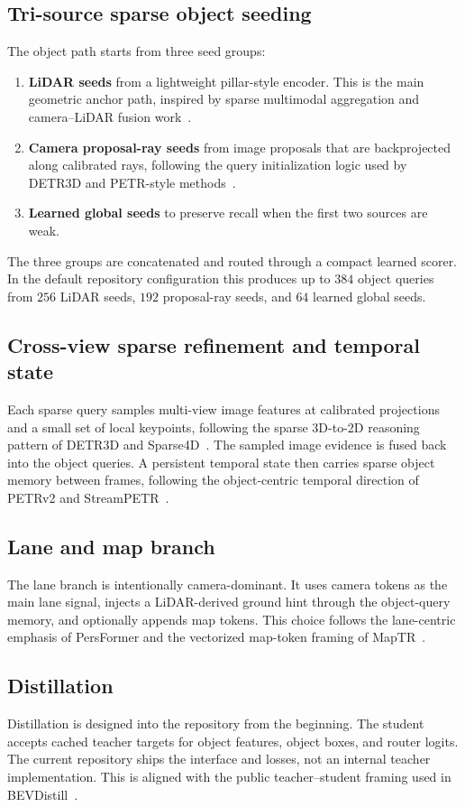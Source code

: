 \documentclass[11pt]{article}
\begin{document}
\subsection{Tri-source sparse object seeding}
The object path starts from three seed groups:
\begin{enumerate}
\item \textbf{LiDAR seeds} from a lightweight pillar-style encoder. This is the main geometric anchor path, inspired by sparse multimodal aggregation and camera--LiDAR fusion work~\cite{sparse4d,cmt}.
\item \textbf{Camera proposal-ray seeds} from image proposals that are backprojected along calibrated rays, following the query initialization logic used by DETR3D and PETR-style methods~\cite{detr3d,petr}.
\item \textbf{Learned global seeds} to preserve recall when the first two sources are weak.
\end{enumerate}

The three groups are concatenated and routed through a compact learned scorer. In the default repository configuration this produces up to $384$ object queries from $256$ LiDAR seeds, $192$ proposal-ray seeds, and $64$ learned global seeds.

\subsection{Cross-view sparse refinement and temporal state}
Each sparse query samples multi-view image features at calibrated projections and a small set of local keypoints, following the sparse 3D-to-2D reasoning pattern of DETR3D and Sparse4D~\cite{detr3d,sparse4d}. The sampled image evidence is fused back into the object queries. A persistent temporal state then carries sparse object memory between frames, following the object-centric temporal direction of PETRv2 and StreamPETR~\cite{petrv2,streampetr}.

\subsection{Lane and map branch}
The lane branch is intentionally camera-dominant. It uses camera tokens as the main lane signal, injects a LiDAR-derived ground hint through the object-query memory, and optionally appends map tokens. This choice follows the lane-centric emphasis of PersFormer and the vectorized map-token framing of MapTR~\cite{persformer,maptr}.

\subsection{Distillation}
Distillation is designed into the repository from the beginning. The student accepts cached teacher targets for object features, object boxes, and router logits. The current repository ships the interface and losses, not an internal teacher implementation. This is aligned with the public teacher--student framing used in BEVDistill~\cite{bevdistill}.
\end{document}
